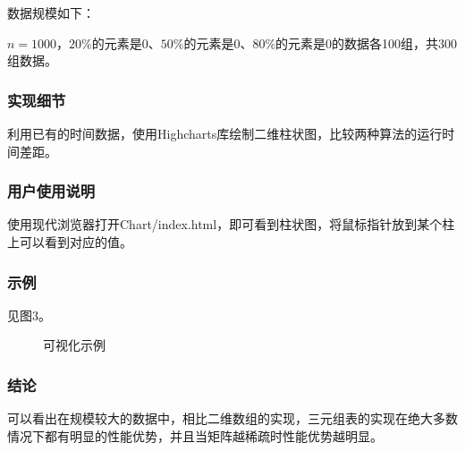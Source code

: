 \documentclass{article}
\begin{document}
数据规模如下：

$n=1000$，$20\%$的元素是0、$50\%$的元素是0、$80\%$的元素是0的数据各100组，共300组数据。

\subsubsection{实现细节}

利用已有的时间数据，使用Highcharts库绘制二维柱状图，比较两种算法的运行时间差距。

\subsubsection{用户使用说明}

使用现代浏览器打开Chart/index.html，即可看到柱状图，将鼠标指针放到某个柱上可以看到对应的值。

\subsubsection{示例}

见图3。

\begin{figure}[htbp]
    
    
    \caption{可视化示例}
    
\end{figure}

\subsubsection{结论}

可以看出在规模较大的数据中，相比二维数组的实现，三元组表的实现在绝大多数情况下都有明显的性能优势，并且当矩阵越稀疏时性能优势越明显。
\end{document}
